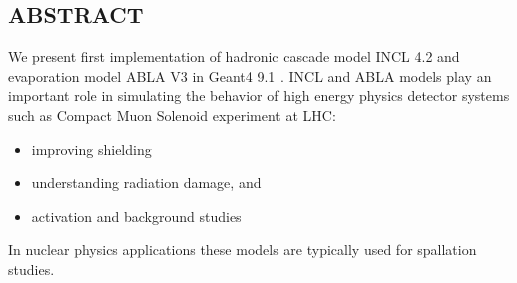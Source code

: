 \documentclass[20pt]{article}
\newenvironment{textbox}
{\begin{lrbox}{\dummybox}\begin{minipage}{0.9\columnwidth}}
{\end{minipage}\end{lrbox}\raisebox{-\depth}{\psshadowbox[framesep=1em,framearc=.1,shadow=true]{\usebox{\dummybox}}}\vspace{0.005\textheight}}
\begin{document}
\begin{center}
\begin{multicols}{3}
\begin{textbox}

\section*{{\Huge {\sf ABSTRACT}}}

{\color{udsect}
We present first implementation \cite{fp} of hadronic cascade model INCL 4.2
\cite{incl} and evaporation model ABLA V3 \cite{abla} in Geant4 9.1 \cite{g4}.
\vskip0.5cm
INCL and ABLA models play an important role in simulating the behavior of high energy physics
detector systems such as Compact Muon Solenoid experiment at LHC:
\begin{itemize}
\item improving shielding
\item understanding radiation damage, and
\item activation and background studies
\end{itemize}
In nuclear physics
applications these models are typically used for spallation studies.

%
%

}

\end{textbox}
\begin{textbox}


\end{textbox}
\end{multicols}
\end{center}
\end{document}
